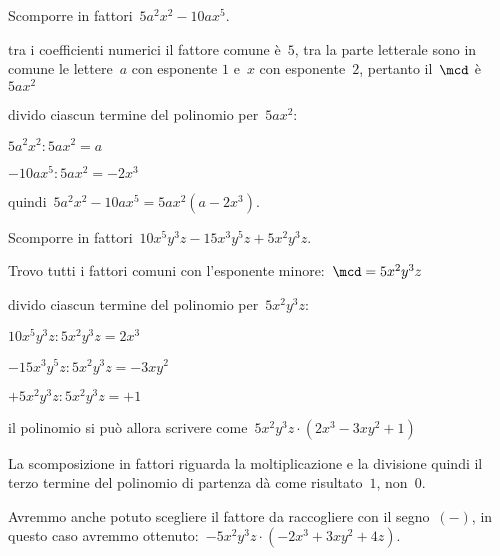 \begin{exrig}
 \begin{esempio}
Scomporre in fattori~$5a^{2}x^{2}-10ax^{5}$.
  \begin{enumeratea}
  \item tra i coefficienti numerici il fattore comune è~$5$, 
   tra la parte letterale sono in comune le lettere~$a$ con esponente $1$ 
   e~$x$ con esponente~$2$, pertanto il~$\mcd$ è~$5ax^{2}$
 \item divido ciascun termine del polinomio per~$5ax^{2}$:
   \begin{itemize*}
   \item $5a^{2}x^{2}:5ax^{2}=a$
   \item $-10ax^{5}:5ax^{2}=-2x^{3}$
   \end{itemize*}
  \item quindi~$5a^{2}x^{2}-10ax^{5}=5ax^{2}(a-2x^{3})$.
  \end{enumeratea}
 \end{esempio}

 \begin{esempio}
Scomporre in fattori~$10x^{5}y^{3}z-15x^{3}y^{5}z+5x^{2}y^{3}z$.
 \begin{enumeratea}
 \item Trovo tutti i fattori comuni con l'esponente minore:~$\mcd=5x^{2}y^{3}z$
 \item divido ciascun termine del polinomio per~$5x^{2}y^{3}z$:
   \begin{itemize*}
   \item $10x^{5}y^{3}z:5x^{2}y^{3}z=2x^{3}$
   \item $-15x^{3}y^{5}z:5x^{2}y^{3}z=-3xy^{2}$
   \item $+5x^{2}y^{3}z:5x^{2}y^{3}z=+1$
   \end{itemize*}
 \item il polinomio si può allora scrivere 
  come~$5x^{2}y^{3}z\cdot (2x^{3}-3xy^{2}+1)$
 \end{enumeratea}
 \end{esempio}

\osservazione La scomposizione in fattori riguarda la moltiplicazione e la 
 divisione quindi il terzo termine del polinomio di partenza dà come 
 risultato~$1$, non~$0$.
 
\osservazione Avremmo anche potuto scegliere il fattore da raccogliere 
 con il segno~$(-)$, in questo caso avremmo 
 ottenuto:~$-5x^{2}y^{3}z\cdot (-2x^{3}+3xy^{2}+4z)$.
 

\end{exrig}
